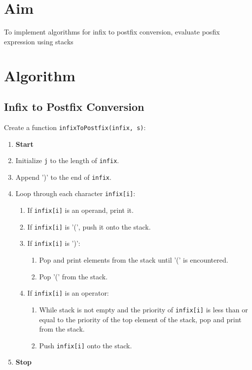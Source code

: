 
\section{Aim}
To implement algorithms for infix to postfix conversion, evaluate posfix expression using stacks

\section{Algorithm}
 {\selectfont

  \subsection{Infix to Postfix Conversion}
  Create a function \texttt{infixToPostfix(infix, s)}:
  \begin{enumerate}[label=\arabic*:,left=0pt]
    \item \textbf{Start}
    \item Initialize \texttt{j} to the length of \texttt{infix}.
    \item Append ')' to the end of \texttt{infix}.
    \item Loop through each character \texttt{infix[i]}:
          \begin{enumerate}[label=2.\arabic*.]
            \item If \texttt{infix[i]} is an operand, print it.
            \item If \texttt{infix[i]} is '(', push it onto the stack.
            \item If \texttt{infix[i]} is ')':
                  \begin{enumerate}[label=2.3.\arabic*.]
                    \item Pop and print elements from the stack until '(' is encountered.
                    \item Pop '(' from the stack.
                  \end{enumerate}
            \item If \texttt{infix[i]} is an operator:
                  \begin{enumerate}[label=2.4.\arabic*.]
                    \item While stack is not empty and the priority of \texttt{infix[i]} is less than or equal \newline to the priority of the top element of the stack, pop and print from the stack.
                    \item Push \texttt{infix[i]} onto the stack.
                  \end{enumerate}
          \end{enumerate}
    \item \textbf{Stop}
  \end{enumerate}

}
